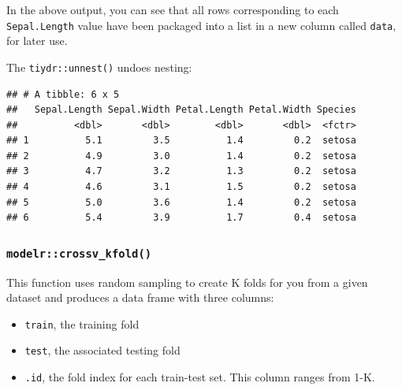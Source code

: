 \documentclass[]{article}
\newenvironment{Shaded}{\begin{snugshade}}{\end{snugshade}}
\newcommand{\KeywordTok}[1]{\textcolor[rgb]{0.13,0.29,0.53}{\textbf{#1}}}
\newcommand{\DecValTok}[1]{\textcolor[rgb]{0.00,0.00,0.81}{#1}}
\newcommand{\StringTok}[1]{\textcolor[rgb]{0.31,0.60,0.02}{#1}}
\newcommand{\OperatorTok}[1]{\textcolor[rgb]{0.81,0.36,0.00}{\textbf{#1}}}
\newcommand{\NormalTok}[1]{#1}
\providecommand{\tightlist}{%
  \setlength{\itemsep}{0pt}\setlength{\parskip}{0pt}}
\begin{document}
In the above output, you can see that all rows corresponding to each
\texttt{Sepal.Length} value have been packaged into a list in a new
column called \texttt{data}, for later use.

The \texttt{tiydr::unnest()} undoes nesting:

\begin{Shaded}
\end{Shaded}

\begin{verbatim}
## # A tibble: 6 x 5
##   Sepal.Length Sepal.Width Petal.Length Petal.Width Species
##          <dbl>       <dbl>        <dbl>       <dbl>  <fctr>
## 1          5.1         3.5          1.4         0.2  setosa
## 2          4.9         3.0          1.4         0.2  setosa
## 3          4.7         3.2          1.3         0.2  setosa
## 4          4.6         3.1          1.5         0.2  setosa
## 5          5.0         3.6          1.4         0.2  setosa
## 6          5.4         3.9          1.7         0.4  setosa
\end{verbatim}

\subsubsection{\texorpdfstring{\texttt{modelr::crossv\_kfold()}}{modelr::crossv\_kfold()}}\label{modelrcrossv_kfold}

This function uses random sampling to create K folds for you from a
given dataset and produces a data frame with three columns:

\begin{itemize}
\tightlist
\item
  \texttt{train}, the training fold
\item
  \texttt{test}, the associated testing fold
\item
  \texttt{.id}, the fold index for each train-test set. This column
  ranges from 1-K.
\end{itemize}

\begin{Shaded}
\end{Shaded}
\end{document}
